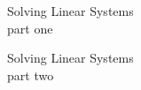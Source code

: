 \documentclass{titlescreen}
\begin{document}
\begin{videotitle}
  Solving Linear Systems \\[1ex]
  part one
\end{videotitle}
\begin{videoend}
  Solving Linear Systems \\[1ex]
  part two
\end{videoend}
\end{document}
